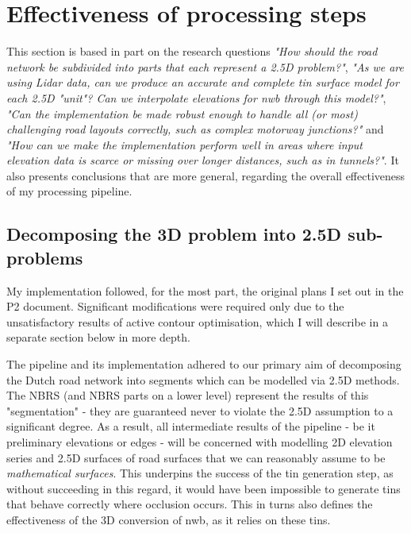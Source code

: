 \section{Effectiveness of processing steps}
\label{sec:effectiveness}

This section is based in part on the research questions \textit{"How should the road network be subdivided into parts that each represent a 2.5D problem?"}, \textit{"As we are using Lidar data, can we produce an accurate and complete \ac{tin} surface model for each 2.5D "unit"? Can we interpolate elevations for \ac{nwb} through this model?"}, \textit{"Can the implementation be made robust enough to handle all (or \textit{most}) challenging road layouts correctly, such as complex motorway junctions?"} and \textit{"How can we make the implementation perform well in areas where input elevation data is scarce or missing over longer distances, such as in tunnels?"}. It also presents conclusions that are more general, regarding the overall effectiveness of my processing pipeline.

\subsection{Decomposing the 3D problem into 2.5D sub-problems}
\label{sub:effectivenessdecomposition}

My implementation followed, for the most part, the original plans I set out in the P2 document. Significant modifications were required only due to the unsatisfactory results of active contour optimisation, which I will describe in a separate section below in more depth.

The pipeline and its implementation adhered to our primary aim of decomposing the Dutch road network into segments which can be modelled via 2.5D methods. The NBRS (and NBRS parts on a lower level) represent the results of this "segmentation" - they are guaranteed never to violate the 2.5D assumption to a significant degree. As a result, all intermediate results of the pipeline - be it preliminary elevations or edges - will be concerned with modelling 2D elevation series and 2.5D surfaces of road surfaces that we can reasonably assume to be \textit{mathematical surfaces}. This underpins the success of the \ac{tin} generation step, as without succeeding in this regard, it would have been impossible to generate \ac{tin}s that behave correctly where occlusion occurs. This in turns also defines the effectiveness of the 3D conversion of \ac{nwb}, as it relies on these \ac{tin}s.

